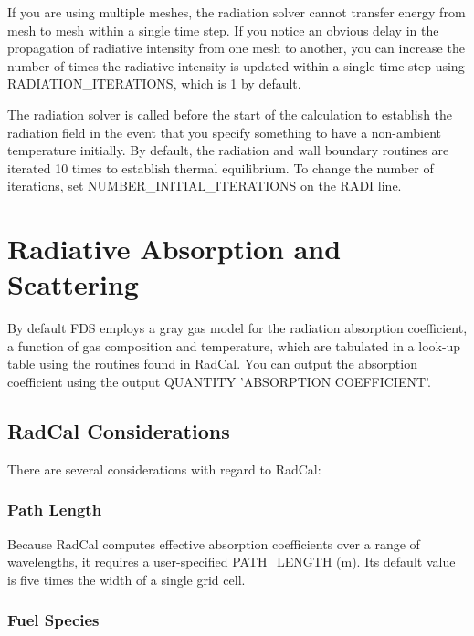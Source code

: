 \documentclass[11pt]{book}
\begin{document}
If you are using multiple meshes, the radiation solver cannot transfer energy from mesh to mesh within a single time step. If you notice an obvious delay in the propagation of radiative intensity from one mesh to another, you can increase the number of times the radiative intensity is updated within a single time step using {\ct RADIATION\_ITERATIONS}, which is 1 by default.

The radiation solver is called before the start of the calculation to establish the radiation field in the event that you specify something to have a non-ambient temperature initially. By default, the radiation and wall boundary routines are iterated 10 times to establish thermal equilibrium. To change the number of iterations, set {\ct NUMBER\_INITIAL\_ITERATIONS} on the {\ct RADI} line.



\section{Radiative Absorption and Scattering}
\label{info:RADI_RADCAL_Absorption}

By default FDS employs a gray gas model for the radiation absorption coefficient, a function
of gas composition and temperature, which are
tabulated in a look-up table using the routines found in RadCal. You can output the absorption coefficient using the output {\ct QUANTITY} {\ct 'ABSORPTION COEFFICIENT'}.

\subsection{RadCal Considerations}

\label{info:RadCal}

There are several considerations with regard to RadCal:

\subsubsection{Path Length}

Because RadCal computes effective absorption coefficients over a range of wavelengths, it requires a user-specified {\ct PATH\_LENGTH} (m).
Its default value is five times the width of a single grid cell.

\subsubsection{Fuel Species}
\end{document}
